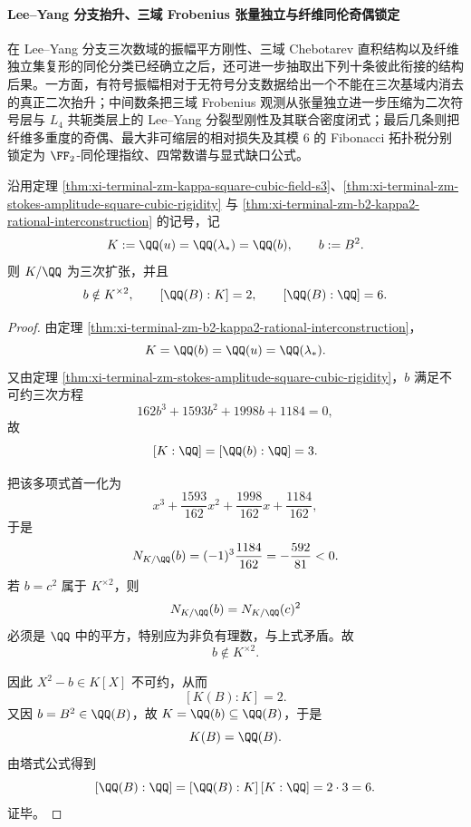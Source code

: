 \paragraph{Lee--Yang 分支抬升、三域 Frobenius 张量独立与纤维同伦奇偶锁定}
在 Lee--Yang 分支三次数域的振幅平方刚性、三域 Chebotarev 直积结构以及纤维独立集复形的同伦分类已经确立之后，还可进一步抽取出下列十条彼此衔接的结构后果。一方面，有符号振幅相对于无符号分支数据给出一个不能在三次基域内消去的真正二次抬升；中间数条把三域 Frobenius 观测从张量独立进一步压缩为二次符号层与 \(L_4\) 共轭类层上的 Lee--Yang 分裂型刚性及其联合密度闭式；最后几条则把纤维多重度的奇偶、最大非可缩层的相对损失及其模 \(6\) 的 Fibonacci 拓扑税分别锁定为 \(\FF_2\)-同伦理指纹、四常数谱与显式缺口公式。

\begin{theorem}\label{thm:xi-time-part62d-leyang-signed-amplitude-exact-degree6}
沿用定理 \ref{thm:xi-terminal-zm-kappa-square-cubic-field-s3}、\ref{thm:xi-terminal-zm-stokes-amplitude-square-cubic-rigidity} 与 \ref{thm:xi-terminal-zm-b2-kappa2-rational-interconstruction} 的记号，记
\[
K:=\QQ(u)=\QQ(\lambda_*)=\QQ(b),
\qquad
b:=B^2.
\]
则 \(K/\QQ\) 为三次扩张，并且
\[
b\notin K^{\times 2},
\qquad
[\QQ(B):K]=2,
\qquad
[\QQ(B):\QQ]=6.
\]
\end{theorem}
\begin{proof}
由定理 \ref{thm:xi-terminal-zm-b2-kappa2-rational-interconstruction}，
\[
K=\QQ(b)=\QQ(u)=\QQ(\lambda_*).
\]
又由定理 \ref{thm:xi-terminal-zm-stokes-amplitude-square-cubic-rigidity}，\(b\) 满足不可约三次方程
\[
162b^3+1593b^2+1998b+1184=0,
\]
故
\[
[K:\QQ]=[\QQ(b):\QQ]=3.
\]

把该多项式首一化为
\[
x^3+\frac{1593}{162}x^2+\frac{1998}{162}x+\frac{1184}{162},
\]
于是
\[
N_{K/\QQ}(b)=(-1)^3\frac{1184}{162}=-\frac{592}{81}<0.
\]
若 \(b=c^2\) 属于 \(K^{\times 2}\)，则
\[
N_{K/\QQ}(b)=N_{K/\QQ}(c)^2
\]
必须是 \(\QQ\) 中的平方，特别应为非负有理数，与上式矛盾。故
\[
b\notin K^{\times 2}.
\]

因此 \(X^2-b\in K[X]\) 不可约，从而
\[
[K(B):K]=2.
\]
又因 \(b=B^2\in \QQ(B)\)，故 \(K=\QQ(b)\subseteq \QQ(B)\)，于是
\[
K(B)=\QQ(B).
\]
由塔式公式得到
\[
[\QQ(B):\QQ]=[\QQ(B):K]\,[K:\QQ]=2\cdot 3=6.
\]
证毕。
\end{proof}


